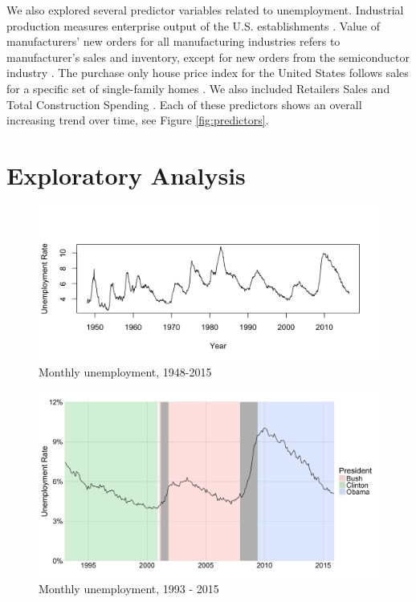 \documentclass[twoside,twocolumn]{article}
\begin{document}
We also explored several predictor variables related to unemployment.  Industrial production measures enterprise output of the U.S. establishments \citep{BGFS2016}. Value of manufacturers' new orders for all manufacturing industries refers to manufacturer's sales and inventory, except for new orders from the semiconductor industry \citep{vmno}. The purchase only house price index for the United States follows sales for a specific set of single-family homes \citep{fhfa2016}. We also included Retailers Sales \citep{retail2016} and Total Construction Spending \citep{construction2016}. Each of these predictors shows an overall increasing trend over time, see Figure \ref{fig:predictors}.

\section{Exploratory Analysis}
		\begin{figure}[htb]
		\centering
		\caption{Monthly unemployment, 1948-2015}
		\label{fig:unemployment}
		\includegraphics[width=\linewidth]{images/unemployment_total_sa}
	\end{figure}
	
				\begin{figure}[htb]
		\centering
		\caption{Monthly unemployment, 1993 - 2015}
		\label{fig:presunemp}
		\includegraphics[width=\linewidth]{images/presunemp}
		\end{figure}
\end{document}
